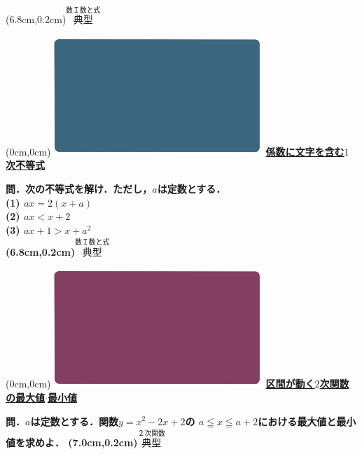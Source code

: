 \documentclass[10pt,
fleqn,
dvipdfmx,
uplatex
]{jsarticle}
\begin{document}
\at(6.8cm,0.2cm){\small\color{bradorange}$\overset{\text{数Ｉ数と式}}{\text{典型}}$}


\newpage



\at(0cm,0cm){\includegraphics[width=8cm,bb=0 0 1920 1080]{./youtube/thumbnails/templates/smart_background/数I数と式.jpeg}}
{\color{orange}\bf\boldmath\Large\underline{係数に文字を含む$1$次不等式}}\vspace{0.3zw}

\large 
\bf\boldmath 問．次の不等式を解け．ただし，$a$は定数とする．\\
(1)  $ax=2\left(x+a\right)$\\
(2)  $ax<x+2$\\
(3)  $ax+1>x+a^2$\\

\at(6.8cm,0.2cm){\small\color{bradorange}$\overset{\text{数Ｉ数と式}}{\text{典型}}$}


\newpage



\at(0cm,0cm){\includegraphics[width=8cm,bb=0 0 1920 1080]{./youtube/thumbnails/templates/smart_background/２次関数.jpeg}}
{\color{orange}\bf\boldmath\large\underline{区間が動く$2$次関数の最大値$\cdot$最小値}}\vspace{0.3zw}

\Large 
\bf\boldmath 問．$a$は定数とする．関数$y=x^2-2x+2$の
$a\leqq x\leqq a+2$における最大値と最小値を求めよ．
\at(7.0cm,0.2cm){\small\color{bradorange}$\overset{\text{２次関数}}{\text{典型}}$}


\newpage
\end{document}

